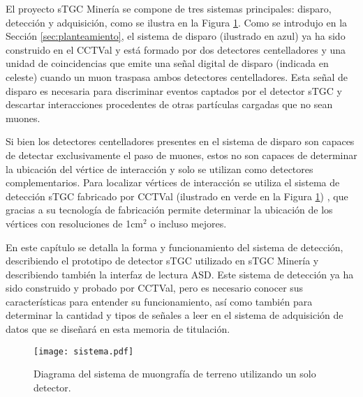 El proyecto sTGC Minería se compone de tres sistemas principales: disparo, detección y adquisición, como se ilustra en la Figura \ref{fig:sistema-completo}. Como se introdujo en la Sección \ref{sec:planteamiento}, el sistema de disparo \cite{Oyanadel2020SistemaSTGC} (ilustrado en azul)  ya ha sido construido en el CCTVal y está formado por dos detectores centelladores y una unidad de coincidencias que emite una señal digital de disparo (indicada en celeste)  cuando un muon traspasa ambos detectores centelladores. Esta señal de disparo es necesaria para discriminar eventos captados por el detector sTGC y descartar interacciones procedentes de otras partículas cargadas que no sean muones. %
	
Si bien los detectores centelladores presentes en el sistema de disparo son capaces de detectar exclusivamente el paso de muones, estos no son capaces de determinar la ubicación del vértice de interacción y solo se utilizan como detectores complementarios. Para localizar vértices de interacción se utiliza el sistema de detección sTGC fabricado por CCTVal (ilustrado en verde en la Figura \ref{fig:sistema-completo}) , que gracias a su tecnología de fabricación permite determinar la ubicación de los vértices con resoluciones de 1cm$^2$ o incluso mejores.
	
En este capítulo se detalla la forma y funcionamiento del sistema de detección, describiendo el prototipo de detector sTGC utilizado en sTGC Minería y describiendo también la interfaz de lectura ASD. Este sistema de detección ya ha sido construido y probado por CCTVal, pero es necesario conocer sus características para entender su funcionamiento, así como también para determinar la cantidad y tipos de señales a leer en el sistema de adquisición de datos que se diseñará en esta memoria de titulación.
	


	\begin{figure}[h]
		\centering
		\texttt{[image: sistema.pdf]}
		\caption{Diagrama del sistema de muongrafía de terreno utilizando un solo detector.}
		\label{fig:sistema-completo}
	\end{figure}